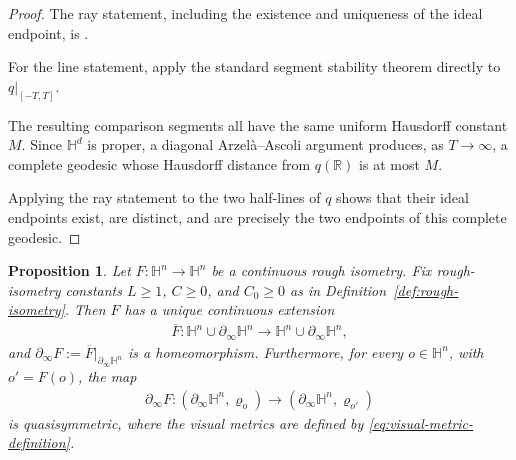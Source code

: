 \documentclass[11pt]{amsart}
\theoremstyle{plain}
\newtheorem{proposition}[theorem]{Proposition}
\theoremstyle{plain}
\theoremstyle{plain}
\newcommand{\Hn}{\mathbb H^n}
\newcommand{\bdry}{\partial_\infty}
\numberwithin{equation}{section}
\begin{document}
\begin{proof}
The ray statement, including the existence and uniqueness of the ideal endpoint,
is \cite[Lemma~III.H.3.1, pp.~427--428]{BridsonHaefliger}.


For the line statement, apply the standard segment stability theorem
\cite[Theorem~III.H.1.7, pp.~401--402]{BridsonHaefliger} directly to
\(q|_{[-T,T]}\).

The resulting comparison
segments all have the same uniform Hausdorff constant \(M\).  Since
\(\mathbb H^d\) is proper, a diagonal Arzel\`a--Ascoli argument produces,
as \(T\to\infty\), a complete geodesic whose Hausdorff distance from
\(q(\mathbb R)\) is at most \(M\). 

Applying the ray statement to the two
half-lines of \(q\) shows that their ideal endpoints exist, are distinct,
and are precisely the two endpoints of this complete geodesic.
\end{proof}

\begin{proposition}\label{prop:rough-boundary-extension}
Let
$
F:\Hn\longrightarrow\Hn
$ 
be a continuous rough isometry.  Fix rough-isometry constants
\(L\geq1\), \(C\geq0\), and \(C_0\geq0\) as in
Definition~\ref{def:rough-isometry}.  Then \(F\) has a unique continuous
extension
\begin{align}
\overline F:\Hn\cup\bdry\Hn
\longrightarrow
\Hn\cup\bdry\Hn,
\nonumber
\end{align}
and
$
\bdry F:=\overline F|_{\bdry\Hn}
$ 
is a homeomorphism. Furthermore, for every \(o\in\Hn\), with \(o'=F(o)\), the map
\begin{align}
\bdry F:
(\bdry\Hn,\varrho_o)
\longrightarrow
(\bdry\Hn,\varrho_{o'})
\nonumber
\end{align}
is quasisymmetric, where the visual metrics are defined by
\eqref{eq:visual-metric-definition}.
\end{proposition}
\end{document}
